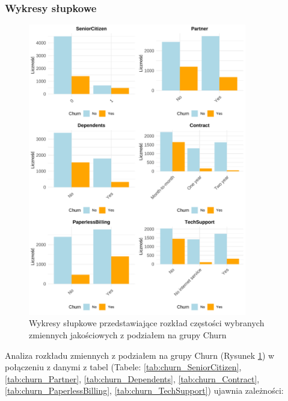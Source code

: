 \documentclass[12pt, a4paper]{article}\usepackage[]{graphicx}\usepackage[]{xcolor}
\newenvironment{knitrout}{}{} %
\begin{document}
\subsubsection{Wykresy słupkowe}
\begin{knitrout}
\color{fgcolor}\begin{figure}[H]

{\centering \includegraphics[width=0.85\textwidth]{figure/wykresy-slupkowe-churn-1} 

}

\caption{\label{fig:wykresy-slupkowe-churn} Wykresy słupkowe przedstawiające rozkład częstości wybranych zmiennych jakościowych z podziałem na grupy Churn}\label{fig:wykresy-slupkowe-churn}
\end{figure}

\end{knitrout}

\newpage
Analiza rozkładu zmiennych z podziałem na grupy Churn (Rysunek \ref{fig:wykresy-slupkowe-churn}) w połączeniu z danymi z tabel (Tabele: \ref{tab:churn_SeniorCitizen}, \ref{tab:churn_Partner}, \ref{tab:churn_Dependents}, \ref{tab:churn_Contract}, \ref{tab:churn_PaperlessBilling}, \ref{tab:churn_TechSupport}) ujawnia zależności:
\end{document}
